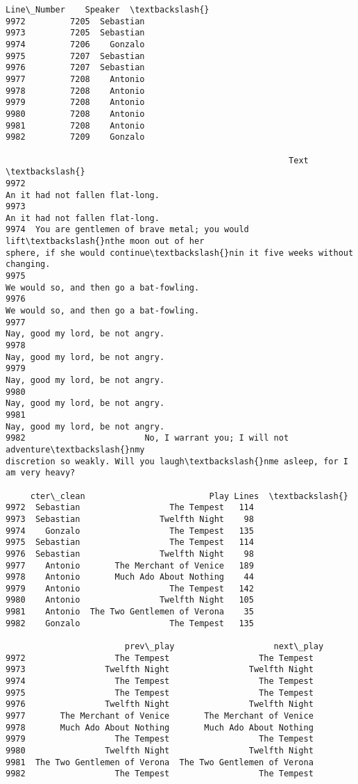\documentclass[11pt]{article}
\makeatletter
\newcommand{\boxspacing}{\kern\kvtcb@left@rule\kern\kvtcb@boxsep}
\newcommand{\prompt}[4]{
        \ttfamily\llap{{\color{#2}[#3]:\hspace{3pt}#4}}\vspace{-\baselineskip}
    }
\makeatother
\begin{document}
            \begin{tcolorbox}[breakable, size=fbox, boxrule=.5pt, pad at break*=1mm, opacityfill=0]
\prompt{Out}{outcolor}{21}{\boxspacing}
\begin{Verbatim}[commandchars=\\\{\}]
      Line\_Number    Speaker  \textbackslash{}
9972         7205  Sebastian
9973         7205  Sebastian
9974         7206    Gonzalo
9975         7207  Sebastian
9976         7207  Sebastian
9977         7208    Antonio
9978         7208    Antonio
9979         7208    Antonio
9980         7208    Antonio
9981         7208    Antonio
9982         7209    Gonzalo

                                                         Text  \textbackslash{}
9972
An it had not fallen flat-long.
9973
An it had not fallen flat-long.
9974  You are gentlemen of brave metal; you would lift\textbackslash{}nthe moon out of her
sphere, if she would continue\textbackslash{}nin it five weeks without changing.
9975
We would so, and then go a bat-fowling.
9976
We would so, and then go a bat-fowling.
9977
Nay, good my lord, be not angry.
9978
Nay, good my lord, be not angry.
9979
Nay, good my lord, be not angry.
9980
Nay, good my lord, be not angry.
9981
Nay, good my lord, be not angry.
9982                        No, I warrant you; I will not adventure\textbackslash{}nmy
discretion so weakly. Will you laugh\textbackslash{}nme asleep, for I am very heavy?

     cter\_clean                         Play Lines  \textbackslash{}
9972  Sebastian                  The Tempest   114
9973  Sebastian                Twelfth Night    98
9974    Gonzalo                  The Tempest   135
9975  Sebastian                  The Tempest   114
9976  Sebastian                Twelfth Night    98
9977    Antonio       The Merchant of Venice   189
9978    Antonio       Much Ado About Nothing    44
9979    Antonio                  The Tempest   142
9980    Antonio                Twelfth Night   105
9981    Antonio  The Two Gentlemen of Verona    35
9982    Gonzalo                  The Tempest   135

                        prev\_play                    next\_play
9972                  The Tempest                  The Tempest
9973                Twelfth Night                Twelfth Night
9974                  The Tempest                  The Tempest
9975                  The Tempest                  The Tempest
9976                Twelfth Night                Twelfth Night
9977       The Merchant of Venice       The Merchant of Venice
9978       Much Ado About Nothing       Much Ado About Nothing
9979                  The Tempest                  The Tempest
9980                Twelfth Night                Twelfth Night
9981  The Two Gentlemen of Verona  The Two Gentlemen of Verona
9982                  The Tempest                  The Tempest
\end{Verbatim}
\end{tcolorbox}
        
\end{document}
